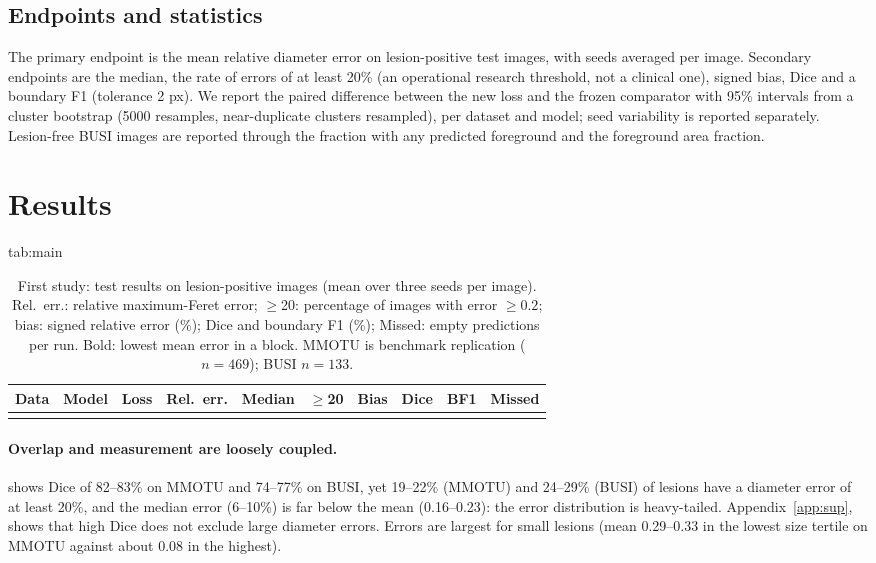 \documentclass{midl}
\begin{document}
\subsection{Endpoints and statistics}
The primary endpoint is the mean relative diameter error on lesion-positive test images, with seeds averaged per image. Secondary endpoints are the median, the rate of errors of at least 20\% (an operational research threshold, not a clinical one), signed bias, Dice and a boundary F1 (tolerance 2 px). We report the paired difference between the new loss and the frozen comparator with 95\% intervals from a cluster bootstrap \citep{field2007bootstrap} (5000 resamples, near-duplicate clusters resampled), per dataset and model; seed variability is reported separately. Lesion-free BUSI images are reported through the fraction with any predicted foreground and the foreground area fraction.

\section{Results}\label{sec:results}

\begin{table}[htbp]
\floatconts
  {tab:main}
  {\caption{First study: test results on lesion-positive images (mean over three seeds per image). Rel.\ err.: relative maximum-Feret error; $\ge$20: percentage of images with error $\ge0.2$; bias: signed relative error (\%); Dice and boundary F1 (\%); Missed: empty predictions per run. Bold: lowest mean error in a block. MMOTU is benchmark replication ($n=469$); BUSI $n=133$.}}
  {\scriptsize\setlength{\tabcolsep}{3pt}\begin{tabular}{llllllllll}
  \toprule
  Data & Model & Loss & Rel.\ err. & Median & $\ge$20 & Bias & Dice & BF1 & Missed\\
  \midrule
  \relax
  \bottomrule
  \end{tabular}}
\end{table}

\paragraph{Overlap and measurement are loosely coupled.}
 shows Dice of 82--83\% on MMOTU and 74--77\% on BUSI, yet 19--22\% (MMOTU) and 24--29\% (BUSI) of lesions have a diameter error of at least 20\%, and the median error (6--10\%) is far below the mean (0.16--0.23): the error distribution is heavy-tailed. Appendix~\ref{app:sup},  shows that high Dice does not exclude large diameter errors. Errors are largest for small lesions (mean 0.29--0.33 in the lowest size tertile on MMOTU against about 0.08 in the highest).
\end{document}
